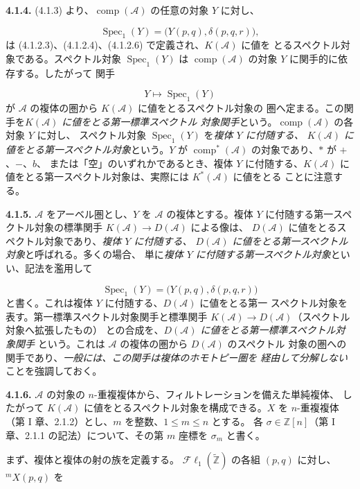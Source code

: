 \clearpage
{}%
\begingroup\small\setlength{\parskip}{0pt}\setlength{\emergencystretch}{1.5em}
\setlength{\abovedisplayskip}{4pt plus 2pt minus 2pt}%
\setlength{\belowdisplayskip}{4pt plus 2pt minus 2pt}%

\medskip\noindent\textbf{4.1.4.}\quad
(4.1.3) より、$\operatorname{comp}(\mathcal A)$ の任意の対象 $Y$ に対し、

\[
\operatorname{Spec}_1(Y)=\bigl(Y(p,q),\delta(p,q,r)\bigr),
\]
は (4.1.2.3)、(4.1.2.4)、(4.1.2.6) で定義され、$K(\mathcal A)$ に値を
とるスペクトル対象である。スペクトル対象 $\operatorname{Spec}_1(Y)$ は
$\operatorname{comp}(\mathcal A)$ の対象 $Y$ に関手的に依存する。したがって
関手

\[
Y\longmapsto\operatorname{Spec}_1(Y)
\]
が $\mathcal A$ の複体の圏から $K(\mathcal A)$ に値をとるスペクトル対象の
圏へ定まる。この関手を\emph{$K(\mathcal A)$ に値をとる第一標準スペクトル
対象関手}という。$\operatorname{comp}(\mathcal A)$ の各対象 $Y$ に対し、
スペクトル対象 $\operatorname{Spec}_1(Y)$ を\emph{複体 $Y$ に付随する、
$K(\mathcal A)$ に値をとる第一スペクトル対象}という。$Y$ が
$\operatorname{comp}^{*}(\mathcal A)$ の対象であり、$*$ が $+$、$-$、$b$、
または「空」のいずれかであるとき、複体 $Y$ に付随する、$K(\mathcal A)$
に値をとる第一スペクトル対象は、実際には $K^{*}(\mathcal A)$ に値をとる
ことに注意する。

\medskip\noindent\textbf{4.1.5.}\quad
$\mathcal A$ をアーベル圏とし、$Y$ を $\mathcal A$ の複体とする。複体
$Y$ に付随する第一スペクトル対象の標準関手
$K(\mathcal A)\longrightarrow D(\mathcal A)$ による像は、
$D(\mathcal A)$ に値をとるスペクトル対象であり、\emph{複体 $Y$ に付随する、
$D(\mathcal A)$ に値をとる第一スペクトル対象}と呼ばれる。多くの場合、
単に\emph{複体 $Y$ に付随する第一スペクトル対象}といい、記法を濫用して

\[
\operatorname{Spec}_1(Y)=\bigl(Y(p,q),\delta(p,q,r)\bigr)
\]
と書く。これは複体 $Y$ に付随する、$D(\mathcal A)$ に値をとる第一
スペクトル対象を表す。第一標準スペクトル対象関手と標準関手
$K(\mathcal A)\longrightarrow D(\mathcal A)$（スペクトル対象へ拡張したもの）
との合成を、\emph{$D(\mathcal A)$ に値をとる第一標準スペクトル対象関手}
という。これは $\mathcal A$ の複体の圏から $D(\mathcal A)$ のスペクトル
対象の圏への関手であり、\emph{一般には、この関手は複体のホモトピー圏を
経由して分解しない}ことを強調しておく。

\medskip\noindent\textbf{4.1.6.}\quad
$\mathcal A$ の対象の $n$-重複複体から、フィルトレーションを備えた単純複体、
したがって $K(\mathcal A)$ に値をとるスペクトル対象を構成できる。$X$ を
$n$-重複複体（第 I 章、2.1.2）とし、$m$ を整数、$1\leq m\leq n$ とする。
各 $\sigma\in\mathbb Z[n]$（第 I 章、2.1.1 の記法）について、その第
$m$ 座標を $\sigma_m$ と書く。

まず、複体と複体の射の族を定義する。
$\mathcal{F}\ell_1(\widetilde{\mathbb Z})$ の各組 $(p,q)$ に対し、
${}^{m}X(p,q)$ を
\endgroup
